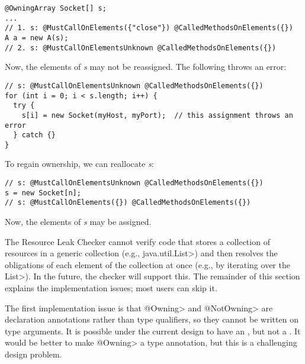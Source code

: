 \begin{verbatim}
@OwningArray Socket[] s;
...
// 1. s: @MustCallOnElements({"close"}) @CalledMethodsOnElements({})
A a = new A(s);
// 2. s: @MustCallOnElementsUnknown @CalledMethodsOnElements({})
\end{verbatim}

Now, the elements of \textit{s} may not be reassigned. The following throws an error:

\begin{verbatim}
// s: @MustCallOnElementsUnknown @CalledMethodsOnElements({})
for (int i = 0; i < s.length; i++) {
  try {
    s[i] = new Socket(myHost, myPort);  // this assignment throws an error
  } catch {}
}
\end{verbatim}

To regain ownership, we can reallocate \textit{s}:

\begin{verbatim}
// s: @MustCallOnElementsUnknown @CalledMethodsOnElements({})
s = new Socket[n];
// s: @MustCallOnElements({}) @CalledMethodsOnElements({})
\end{verbatim}

Now, the elements of \textit{s} may be assigned.




The Resource Leak Checker cannot verify code that stores a collection of
resources in a generic collection (e.g., \<java.util.List>) and then
resolves the obligations of each element of the collection at once (e.g.,
by iterating over the \<List>).  In the future, the checker will support
this.  The remainder of this section explains the implementation issues;
most users can skip it.

The first implementation issue is that \<@Owning> and \<@NotOwning> are
declaration annotations rather than type qualifiers, so they cannot be
written on type arguments. It is possible under the current design to have
an , but not a .
It would be better to make \<@Owning> a type annotation, but this is a
challenging design problem.

